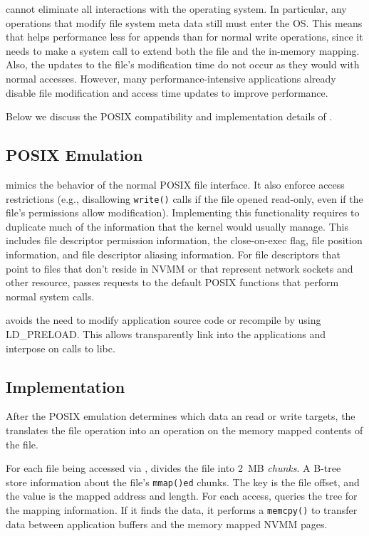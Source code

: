 \DAChell{} cannot eliminate all interactions with the operating system.  In
particular, any operations that modify file system meta data still must enter
the OS.  This means that \DAChell{} helps performance less for appends than for
normal write operations, since it needs to make a system call to extend both
the file and the in-memory mapping.  
Also, the updates to the file's modification time do not occur as they
would with normal accesses.  However, many performance-intensive applications
already disable file modification and access time updates to improve
performance.

Below we discuss the POSIX compatibility and implementation details of
\DAChell{}.

\subsection{POSIX Emulation}

\DAChell{} mimics the behavior of the normal POSIX file
interface. It also
enforce access restrictions (e.g., disallowing \texttt{write()} calls if the
file opened read-only, even if the file's permissions allow modification).
Implementing this functionality requires \DAChell{} to duplicate much of the
information that the kernel would usually manage.  This includes file
descriptor permission information, the close-on-exec flag, file position
information, and file descriptor aliasing information. For file descriptors
that point to files that don't reside in NVMM or that represent
network sockets and other resource, \DAChell{} passes requests to the default
POSIX functions that perform normal system calls.

\DAChell{} avoids the need to modify application source code or recompile by
using LD\_PRELOAD.  This allows \DAChell{} transparently link into the
applications and interpose on calls to libc.

\subsection{Implementation}

After the POSIX emulation determines which data an read or write targets, the
\DAChell{} translates the file operation into an operation on the memory mapped
contents of the file.

For each file being accessed via \DAChell{}, \DAChell{} divides the file into
2~MB \emph{chunks}.  A B-tree store information about the file's
\texttt{mmap()ed} chunks.  The key is the file offset, and the value is the
mapped address and length.  For each access, \DAChell{} queries the tree for
the mapping information.  If it finds the data, it performs a \texttt{memcpy()}
to transfer data between application buffers and the memory mapped NVMM pages.

